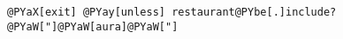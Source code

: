 \begin{Verbatim}[commandchars=@\[\]]
@PYaX[exit] @PYay[unless] restaurant@PYbe[.]include? @PYaW["]@PYaW[aura]@PYaW["]
\end{Verbatim}
